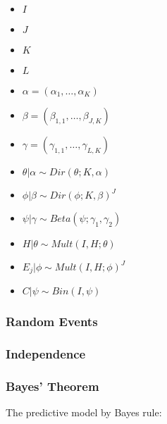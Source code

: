 \begin{itemize}
    \item $I$
    \item $J$
    \item $K$
    \item $L$

    \item $\alpha = (\alpha_{1}, \dots, \alpha_{K})$
    \item $\beta = (\beta_{1,1}, \dots, \beta_{J, K})$
    \item $\gamma = (\gamma_{1,1}, \dots, \gamma_{L, K})$

    \item $\theta \vert \alpha \sim Dir(\theta; K, \alpha)$
    \item $\phi \vert \beta \sim Dir(\phi; K, \beta)^{J}$
    \item $\psi \vert \gamma  \sim Beta(\psi; \gamma_{1}, \gamma_{2})$

    \item $H \vert \theta \sim Mult(I, H; \theta)$
    \item $E_{j} \vert \phi \sim Mult(I, H; \phi)^{J}$
    \item $C \vert \psi \sim Bin(I, \psi)$
\end{itemize}

\subsubsection{Random Events}
\label{sec:bhh:selection_mechanism:random_events}


\subsubsection{Independence}
\label{sec:bhh:selection_mechanism:independence}

\subsubsection{Bayes' Theorem}
\label{sec:bhh:selection_mechanism:bayes_theorem}

The predictive model by Bayes rule:

